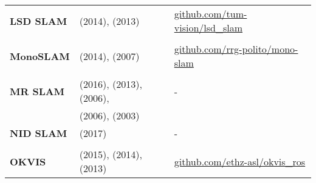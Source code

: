 \documentclass[a4paper,12pt]{scrartcl}
\begin{document}
{\begin{longtable}{l|l|l}
    \textbf{LSD SLAM}      & \cite{Engel2014} (2014), \cite{Engel2013} (2013)                                            & {\href{https://github.com/tum-vision/lsd_slam}{github.com/tum-vision/lsd\_slam}}                                             \\
                           &                                                                                             &                                                                                                                              \\ [-3mm]
    \textbf{MonoSLAM}      & \cite{Russo2014} (2014), \cite{Davison2007} (2007)                                          & {\href{https://github.com/rrg-polito/mono-slam}{github.com/rrg-polito/mono-slam}}                                            \\
                           &                                                                                             &                                                                                                                              \\ [-3mm]
    \textbf{MR SLAM}       & \cite{Choudhary2016} (2016), \cite{Alexandre2013} (2013), \cite{Zhou2006} (2006),           & -                                                                                                                            \\
                           & \cite{Howard2006} (2006), \cite{Liu2003} (2003)                                             &                                                                                                                              \\
    \textbf{NID SLAM}      & \cite{Pascoe2017} (2017)                                                                    & -                                                                                                                            \\
                           &                                                                                             &                                                                                                                              \\ [-3mm]
    \textbf{OKVIS}         & \cite{Leutenegger2015} (2015), \cite{Leutenegger2014} (2014), \cite{Leutenegger2013} (2013) & {\href{https://github.com/ethz-asl/okvis_ros}{github.com/ethz-asl/okvis\_ros}}                                               \\

\end{longtable}}
\end{document}
